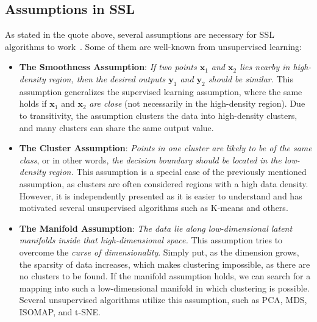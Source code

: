\subsection{Assumptions in SSL}
As stated in the quote above, several assumptions are necessary for SSL algorithms to work~\cite[p. 5]{ssl-book-2006}. 
Some of them are well-known from unsupervised learning:
\begin{itemize}
    \item \textbf{The Smoothness Assumption}: \textit{If two points $\mathbf{x}_1$ and $\mathbf{x}_2$ lies nearby in high-density region, 
    then the desired outputs $\mathbf{y}_1$ and $\mathbf{y}_2$ should be similar.} This assumption generalizes the supervised learning assumption,
    where the same holds if $\mathbf{x}_1$ and $\mathbf{x}_2$ \textit{are close} (not necessarily in the high-density region). Due to transitivity, 
    the assumption clusters the data into high-density clusters, and many clusters can share the same output value.
    \item \textbf{The Cluster Assumption}: \textit{Points in one cluster are likely to be of the same class}, or in other words, \textit{the decision 
    boundary should be located in the low-density region.} This assumption is a special case of the previously mentioned assumption, as clusters are often 
    considered regions with a high data density. However, it is independently presented as it is easier to understand and has motivated several 
    unsupervised algorithms such as K-means and others. %
    \item \textbf{The Manifold Assumption}: \textit{The data lie along low-dimensional latent manifolds inside that high-dimensional space.} This
    assumption tries to overcome the \textit{curse of dimensionality}. Simply put, as the dimension grows, the sparsity of data increases, which makes clustering impossible, as there are no clusters to be found. If the manifold assumption holds, we can search for a mapping into such a 
    low-dimensional manifold in which clustering is possible. Several unsupervised algorithms utilize this assumption, such as PCA, 
    MDS, ISOMAP, and t-SNE.
\end{itemize}



